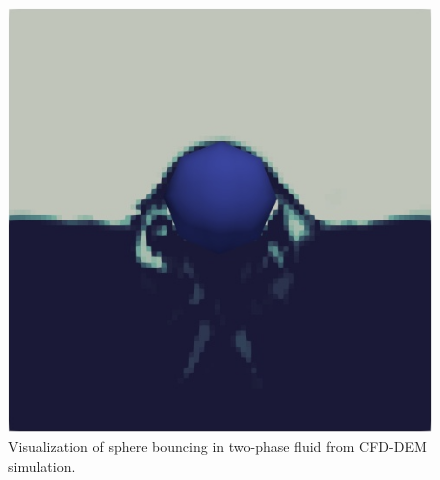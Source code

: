 \begin{figure}[H]
\begin{minipage}{.4\textwidth}
    \end{minipage}%
    \hspace{0.06\textwidth}
    \begin{minipage}{.4\textwidth}
        \centering
        \includegraphics[width=\linewidth]{Images/chap4/water_sphere/sphere_in_water12.png}
    \end{minipage}
    \caption{Visualization of sphere bouncing in two-phase fluid from CFD-DEM simulation.}
    \label{fig:two-phase_sphere}
\end{figure}



